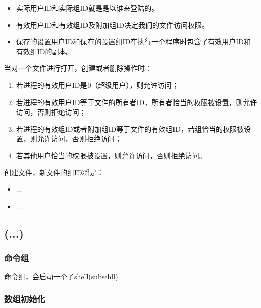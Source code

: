 \begin{itemize}
\item 实际用户ID和实际组ID就是是以谁来登陆的。
\item 有效用户ID和有效组ID及附加组ID决定我们的文件访问权限。
\item 保存的设置用户ID和保存的设置组ID在执行一个程序时包含了有效用户ID和有效组ID的副本。
\end{itemize}

当对一个文件进行打开，创建或者删除操作时：
\begin{enumerate}
\item 若进程的有效用户ID是0（超级用户），则允许访问；
\item 若进程的有效用户ID等于文件的所有者ID，所有者恰当的权限被设置，则允许访问，否则拒绝访问；
\item 若进程的有效组ID或者附加组ID等于文件的有效组ID，若组恰当的权限被设置，则允许访问，否则拒绝访问；
\item 若其他用户恰当的权限被设置，则允许访问，否则拒绝访问。
\end{enumerate}

创建文件，新文件的组ID将是：
\begin{itemize}
\item ...
\item ...
\end{itemize}

\subsection{(...)}

\subsubsection{命令组}

命令组，会启动一个子shell(subsehll).

\subsubsection{数组初始化}





